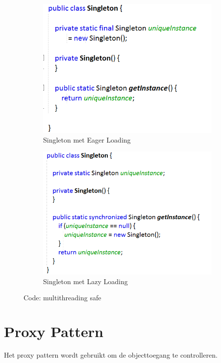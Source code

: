 \documentclass[a4paper,12pt]{article}
\begin{document}
\begin{figure}[H]
\centering
\begin{subfigure}{.49\textwidth}
  \centering
  \includegraphics[width=.9\linewidth]{img/Singleton/SingletonZonderLazyLoading.png}
  \caption{Singleton met Eager Loading}
  \label{fig:SingletonEagerLoading}
\end{subfigure}
\begin{subfigure}{.49\textwidth}
  \centering
  \includegraphics[width=.9\linewidth]{img/Singleton/SingletonMetLazyLoading.png}
  \caption{Singleton met Lazy Loading}
  \label{fig:SingletonLazyLoading}
  \end{subfigure}
\caption{Code: multithreading safe}
\label{fig:SingletonMultithreadSafe}
\end{figure}

\section{Proxy Pattern}
Het proxy pattern wordt gebruikt om de objecttoegang te controlleren.
\end{document}
